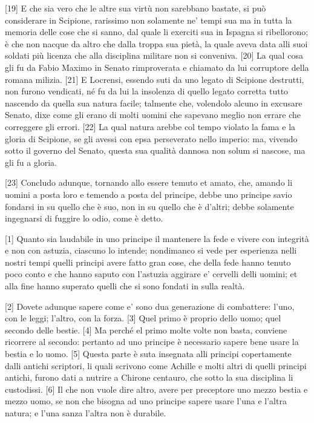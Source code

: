 \quebra

{[}19{]} E che sia vero che le altre sua virtù non sarebbano bastate, si
può considerare in Scipione, rarissimo non solamente ne' tempi sua ma in
tutta la memoria delle cose che si sanno, dal quale li exerciti sua in
Ispagna si ribellorono; è che non nacque da altro che dalla troppa sua
pietà, la quale aveva data alli suoi soldati più licenza che alla
disciplina militare non si conveniva. {[}20{]} La qual cosa gli fu da
Fabio Maximo in Senato rimproverata e chiamato da lui corruptore della
romana milizia. {[}21{]} E Locrensi, essendo suti da uno legato di
Scipione destrutti, non furono vendicati, né fu da lui la insolenza di
quello legato corretta tutto nascendo da quella sua natura facile;
talmente che, volendolo alcuno in excusare Senato, dixe come gli erano
di molti uomini che sapevano meglio non errare che correggere gli
errori. {[}22{]} La qual natura arebbe col tempo violato la fama e la
gloria di Scipione, se gli avessi con epsa perseverato nello imperio:
ma, vivendo sotto il governo del Senato, questa sua qualità dannosa non
solum si nascose, ma gli fu a gloria.

{[}23{]} Concludo adunque, tornando allo essere temuto et amato, che,
amando li uomini a posta loro e temendo a posta del principe, debbe uno
principe savio fondarsi in su quello che è suo, non in su quello che è
d'altri; debbe solamente ingegnarsi di fuggire lo odio, come è detto.


{[}1{]} Quanto sia laudabile in uno principe il mantenere la fede e
vivere con integrità e non con astuzia, ciascuno lo intende; nondimanco
si vede per esperienza nelli nostri tempi quelli principi avere fatto
gran cose, che della fede hanno tenuto poco conto e che hanno saputo con
l'astuzia aggirare e' cervelli delli uomini; et alla fine hanno superato
quelli che si sono fondati in sulla realtà.

{[}2{]} Dovete adunque sapere come e' sono dua generazione di
combattere: l'uno, con le leggi; l'altro, con la forza. {[}3{]} Quel
primo è proprio dello uomo; quel secondo delle bestie. {[}4{]} Ma perché
el primo molte volte non basta, conviene ricorrere al secondo: pertanto
ad uno principe è necessario sapere bene usare la bestia e lo uomo.
{[}5{]} Questa parte è suta insegnata alli principi copertamente dalli
antichi scriptori, li quali scrivono come Achille e molti altri di
quelli principi antichi, furono dati a nutrire a Chirone centauro, che
sotto la sua disciplina li custodissi. {[}6{]} Il che non vuole dire
altro, avere per preceptore uno mezzo bestia e mezzo uomo, se non che
bisogna ad uno principe sapere usare l'una e l'altra natura; e l'una
sanza l'altra non è durabile.


